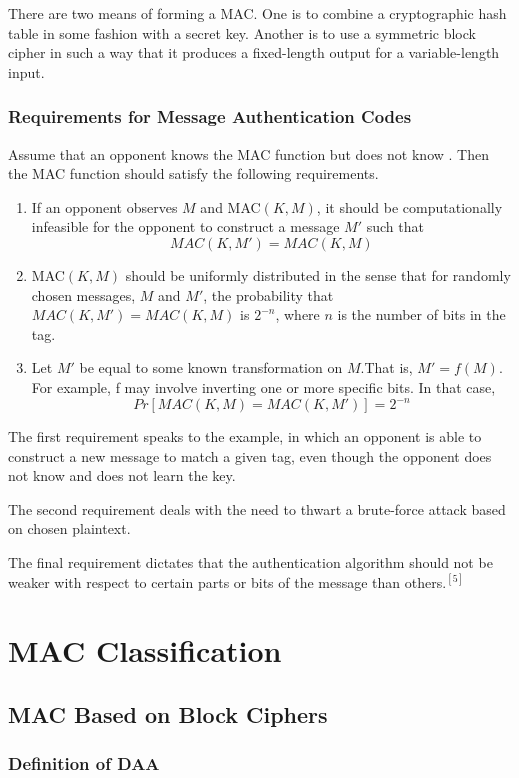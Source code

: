 \documentclass[12pt,a4paper,oneside]{report}
\begin{document}
There are two means of forming a MAC. One is to combine a cryptographic hash table in some fashion with a secret key. Another is to use a symmetric block cipher in such a way that it produces a fixed-length output for a variable-length input.

\subsection{Requirements for Message Authentication Codes}
Assume that an opponent knows the MAC function but does not know . Then the MAC function should satisfy the following requirements.

\begin{enumerate}
    \item If an opponent observes $M$ and MAC$(K,M)$, it should be computationally infeasible for the opponent to construct a message $M'$ such that
    $$MAC(K,M') = MAC(K,M)$$
    \item MAC$(K,M)$ should be uniformly distributed in the sense that for randomly chosen messages, $M$ and $M'$, the probability that $MAC(K,M') = MAC(K,M)$ is $2^{-n}$, where $n$ is the number of bits in the tag.
    \item Let $M'$ be equal to some known transformation on $M$.That is, $M'=f(M)$. For example, f may involve inverting one or more specific bits. In that case,
    $$Pr[MAC(K,M)=MAC(K,M')] = 2^{-n}$$
\end{enumerate}

The first requirement speaks to the example, in which an opponent is able to construct a new message to match a given tag, even though the opponent does not know and does not learn the key.

The second requirement deals with the need to thwart a brute-force attack based on chosen plaintext.

The final requirement dictates that the authentication algorithm should not be weaker with respect to certain parts or bits of the message than others.$^{[5]}$

\chapter{  MAC Classification}
\section{MAC Based on Block Ciphers}
\subsection{Definition of DAA}
\end{document}
